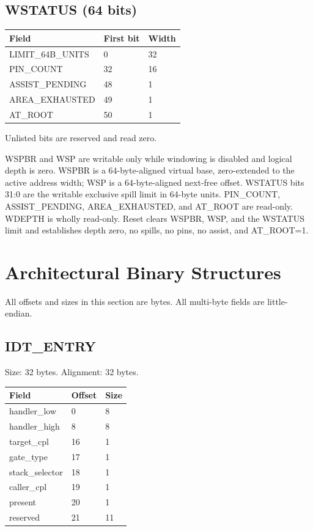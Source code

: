 \documentclass[10pt]{article}
\begin{document}
\subsection{WSTATUS (64 bits)}
\begin{longtable}{@{}L{4.5cm}L{2cm}L{2cm}@{}}
\toprule Field & First bit & Width \\ \midrule
LIMIT\_\allowbreak{}64B\_\allowbreak{}UNITS & 0 & 32 \\
PIN\_\allowbreak{}COUNT & 32 & 16 \\
ASSIST\_\allowbreak{}PENDING & 48 & 1 \\
AREA\_\allowbreak{}EXHAUSTED & 49 & 1 \\
AT\_\allowbreak{}ROOT & 50 & 1 \\
\bottomrule\end{longtable}
Unlisted bits are reserved and read zero.

WSPBR and WSP are writable only while windowing is disabled and logical depth
is zero. WSPBR is a 64-byte-aligned virtual base, zero-extended to the active
address width; WSP is a 64-byte-aligned next-free offset. WSTATUS bits 31:0 are
the writable exclusive spill limit in 64-byte units. PIN\_COUNT,
ASSIST\_PENDING, AREA\_EXHAUSTED, and AT\_ROOT are read-only. WDEPTH is wholly
read-only. Reset clears WSPBR, WSP, and the WSTATUS limit and establishes depth
zero, no spills, no pins, no assist, and AT\_ROOT=1.

\section{Architectural Binary Structures}
All offsets and sizes in this section are bytes. All multi-byte fields are little-endian.
\subsection{IDT\_\allowbreak{}ENTRY}
Size: 32 bytes. Alignment: 32 bytes.
\begin{longtable}{@{}L{4cm}L{2cm}L{2cm}@{}}
\toprule Field & Offset & Size \\ \midrule
handler\_\allowbreak{}low & 0 & 8 \\
handler\_\allowbreak{}high & 8 & 8 \\
target\_\allowbreak{}cpl & 16 & 1 \\
gate\_\allowbreak{}type & 17 & 1 \\
stack\_\allowbreak{}selector & 18 & 1 \\
caller\_\allowbreak{}cpl & 19 & 1 \\
present & 20 & 1 \\
reserved & 21 & 11 \\
\bottomrule\end{longtable}
\end{document}
